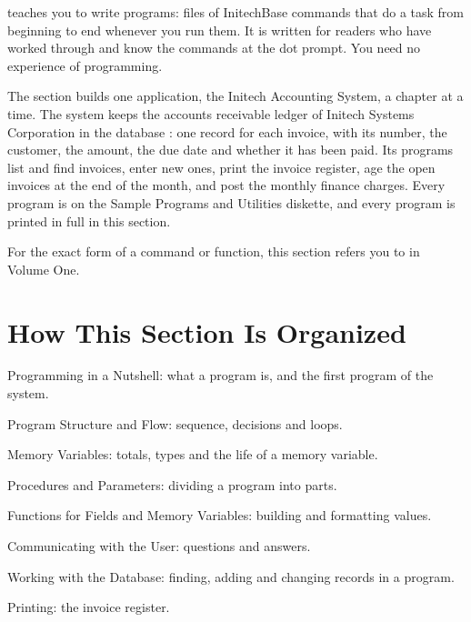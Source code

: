  teaches you to write programs: files of
InitechBase commands that do a task from beginning to end whenever you run
them.  It is written for readers who have worked through
 and know the commands at the dot prompt.  You
need no experience of programming.

The section builds one application, the Initech Accounting System, a chapter
at a time.  The system keeps the accounts receivable ledger of Initech
Systems Corporation in the database : one record for each
invoice, with its number, the customer, the amount, the due date and whether
it has been paid.  Its programs list and find invoices, enter new ones, print
the invoice register, age the open invoices at the end of the month, and post
the monthly finance charges.  Every program is on the Sample Programs and
Utilities diskette, and every program is printed in full in this section.

For the exact form of a command or function, this section refers you to
 in Volume One.

\section{How This Section Is Organized}
Programming in a Nutshell: what a program is, and the first
program of the system.

Program Structure and Flow: sequence, decisions and loops.

Memory Variables: totals, types and the life of a memory
variable.

Procedures and Parameters: dividing a program into parts.

Functions for Fields and Memory Variables: building and
formatting values.

Communicating with the User: questions and answers.

Working with the Database: finding, adding and changing
records in a program.

Printing: the invoice register.

